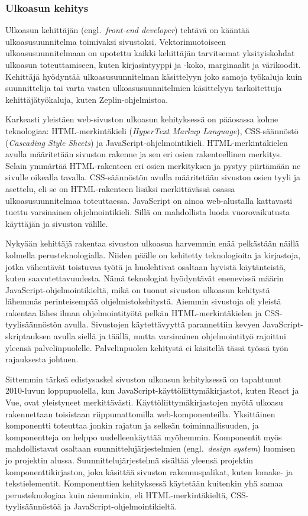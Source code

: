 \documentclass[finnish, 12pt, a4paper, elec, utf8, a-1b]{aaltothesis}
\begin{document}
\subsubsection{Ulkoasun kehitys}\label{background-web-development}

Ulkoasun kehittäjän (engl.~\textit{front-end developer}) tehtävä on kääntää
ulkoasusuunnitelma toimivaksi sivustoksi. Vektorimuotoiseen ulkoasusuunnitelmaan
on upotettu kaikki kehittäjän tarvitsemat yksityiskohdat ulkoasun
toteuttamiseen, kuten kirjasintyyppi ja -koko, marginaalit ja värikoodit.
Kehittäjä hyödyntää ulkoasusuunnitelman käsittelyyn joko samoja työkaluja kuin
suunnittelija tai varta vasten ulkoasusuunnitelmien käsittelyyn tarkoitettuja
kehittäjätyökaluja, kuten Zeplin-ohjelmistoa.

Karkeasti yleistäen web-sivuston ulkoasun kehityksessä on pääosassa kolme
teknologiaa: HTML-merkintäkieli (\textit{HyperText Markup Language}),
CSS-säännöstö (\textit{Cascading Style Sheets}) ja JavaScript-ohjelmointikieli.
HTML-merkintäkielen avulla määritetään sivuston rakenne ja sen eri osien
rakenteellinen merkitys. Selain ymmärtää HTML-rakenteen eri osien merkityksen ja
pystyy piirtämään ne sivulle oikealla tavalla. CSS-säännöstön avulla määritetään
sivuston osien tyyli ja asettelu, eli se on HTML-rakenteen lisäksi merkittävässä
osassa ulkoasusuunnitelmaa toteuttaessa. JavaScript on ainoa web-alustalla
kattavasti tuettu varsinainen ohjelmointikieli. Sillä on mahdollista luoda
vuorovaikutusta käyttäjän ja sivuston välille.

Nykyään kehittäjä rakentaa sivuston ulkoasua harvemmin enää pelkästään näillä
kolmella perusteknologialla. Niiden päälle on kehitetty teknologioita ja
kirjastoja, jotka vähentävät toistuvaa työtä ja huolehtivat osaltaan hyvistä
käytänteistä, kuten saavutettavuudesta. Nämä teknologiat hyödyntävät enenevissä
määrin JavaScript-ohjelmointikieltä, mikä on tuonut sivuston ulkoasun kehitystä
lähemmäs perinteisempää ohjelmistokehitystä. Aiemmin sivustoja oli yleistä
rakentaa lähes ilman ohjelmointityötä pelkän HTML-merkintäkielen ja
CSS-tyylisäännöstön avulla. Sivustojen käytettävyyttä parannettiin kevyen
JavaScript-skriptauksen avulla siellä ja täällä, mutta varsinainen
ohjelmointityö rajoittui yleensä palvelinpuolelle. Palvelinpuolen kehitystä ei
käsitellä tässä työssä työn rajauksesta johtuen.

Sittemmin tärkeä edistysaskel sivuston ulkoasun kehityksessä on tapahtunut
2010-luvun loppupuolella, kun JavaScript-käyttöliittymäkirjastot, kuten React ja
Vue, ovat yleistyneet merkittävästi. Käyttöliittymäkirjastojen myötä ulkoasu
rakennettaan toisistaan riippumattomilla web-komponenteilla. Yksittäinen
komponentti toteuttaa jonkin rajatun ja selkeän toiminnallisuuden, ja
komponentteja on helppo uudelleenkäyttää myöhemmin. Komponentit myös
mahdollistavat osaltaan suunnittelujärjestelmien (engl.~\textit{design system})
luomisen jo projektin alussa. Suunnittelujärjestelmä sisältää yleensä projektin
komponenttikirjaston, joka käsittää sivuston rakennuspalikat, kuten lomake- ja
tekstielementit. Komponenttien kehityksessä käytetään kuitenkin yhä samaa
perusteknologiaa kuin aiemminkin, eli HTML-merkintäkieltä, CSS-tyylisäännöstöä
ja JavaScript-ohjelmointikieltä.
\end{document}
